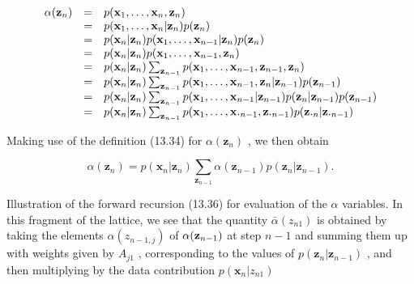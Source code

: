 \documentclass[
  10
]{article}
\begin{document}
\[
\begin{array}{r c l} \alpha (\mathbf {z} _ {n}) & = & p (\mathbf {x} _ {1}, \ldots , \mathbf {x} _ {n}, \mathbf {z} _ {n}) \\ & = & p (\mathbf {x} _ {1}, \ldots , \mathbf {x} _ {n} | \mathbf {z} _ {n}) p (\mathbf {z} _ {n}) \\ & = & p (\mathbf {x} _ {n} | \mathbf {z} _ {n}) p (\mathbf {x} _ {1}, \ldots , \mathbf {x} _ {n - 1} | \mathbf {z} _ {n}) p (\mathbf {z} _ {n}) \\ & = & p (\mathbf {x} _ {n} | \mathbf {z} _ {n}) p (\mathbf {x} _ {1}, \ldots , \mathbf {x} _ {n - 1}, \mathbf {z} _ {n}) \\ & = & p (\mathbf {x} _ {n} | \mathbf {z} _ {n}) \sum_ {\mathbf {z} _ {n - 1}} p (\mathbf {x} _ {1}, \ldots , \mathbf {x} _ {n - 1}, \mathbf {z} _ {n - 1}, \mathbf {z} _ {n}) \\ & = & p (\mathbf {x} _ {n} | \mathbf {z} _ {n}) \sum_ {\mathbf {z} _ {n - 1}} p (\mathbf {x} _ {1}, \ldots , \mathbf {x} _ {n - 1}, \mathbf {z} _ {n} | \mathbf {z} _ {n - 1}) p (\mathbf {z} _ {n - 1}) \\ & = & p (\mathbf {x} _ {n} | \mathbf {z} _ {n}) \sum_ {\mathbf {z} _ {n - 1}} p (\mathbf {x} _ {1}, \ldots , \mathbf {x} _ {n - 1} | \mathbf {z} _ {n - 1}) p (\mathbf {z} _ {n} | \mathbf {z} _ {n - 1}) p (\mathbf {z} _ {n - 1}) \\ & = & p (\mathbf {x} _ {n} | \mathbf {z} _ {n}) \sum_ {\mathbf {z} _ {n - 1}} p (\mathbf {x} _ {1}, \ldots , \mathbf {x}. _ {n - 1}, \mathbf {z}. _ {n - 1}) p (\mathbf {z}. _ {n} | \mathbf {z}. _ {n - 1}) \end{array}
\]

Making use of the definition (13.34) for
\(\alpha ( { \mathbf z } _ { n } )\) , we then obtain

\[
\alpha (\mathbf {z} _ {n}) = p (\mathbf {x} _ {n} | \mathbf {z} _ {n}) \sum_ {\mathbf {z} _ {n - 1}} \alpha (\mathbf {z} _ {n - 1}) p (\mathbf {z} _ {n} | \mathbf {z} _ {n - 1}).\tag{13.36}
\]

Illustration of the forward recursion (13.36) for evaluation of the
\(\alpha\) variables. In this fragment of the lattice, we see that the
quantity \(\bar { \alpha } ( z _ { n 1 } )\) is obtained by taking the
elements \(\alpha ( z _ { n - 1 , j } )\) of
\(\alpha ( { \bf z } _ { n - 1 } )\) at step \(n - 1\) and summing them
up with weights given by \(A _ { j 1 }\) , corresponding to the values
of \(p ( \mathbf { z } _ { n } | \mathbf { z } _ { n - 1 } )\) , and
then multiplying by the data contribution
\(p ( \mathbf { x } _ { n } | z _ { n 1 } )\)
\end{document}
